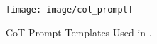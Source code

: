 \begin{figure}[t]
\centering
\texttt{[image: image/cot\_prompt]}
\caption{CoT Prompt Templates Used in \method{}.} 
\label{fig:cot_prompt}
\end{figure}